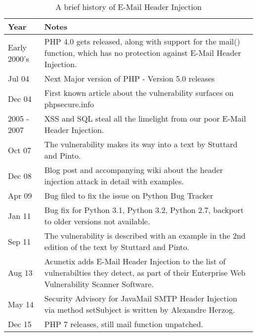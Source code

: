 \begin{table}[!htbp]
	\centering
	\begin{tabular}{|p{2cm}|p{12cm}|}
		\hline
		{Year} & { Notes}\\
		\hline

		{Early 2000's } & { PHP 4.0 gets released, along with support for the mail() function, which has no protection against E-Mail Header Injection.}\\
		\hline

		{Jul 04} & { Next Major version of PHP - Version 5.0 releases}\\
		\hline

		{Dec 04} & { First known article about the vulnerability surfaces on phpsecure.info}\\
		\hline

		{2005 - 2007} & {XSS and SQL steal all the limelight from our poor E-Mail Header Injection.}\\
		\hline

		{Oct 07} & {The vulnerability makes its way into a text by Stuttard and Pinto. }\\
		\hline

		{Dec 08} & {Blog post and accompanying wiki about the header injection attack in detail with examples.}\\
		\hline

		{Apr 09} & {Bug filed to fix the issue on Python Bug Tracker}\\
		\hline

		{Jan 11} & {Bug fix for Python 3.1, Python 3.2, Python 2.7, backport to older versions not available.}\\
		\hline

		{Sep 11} & {The vulnerability is described with an example in the 2nd edition of the text by Stuttard and Pinto.}\\
		\hline

		{Aug 13} & {Acunetix adds E-Mail Header Injection to the list of vulnerabilties they detect, as part of their Enterprise Web Vulnerability Scanner Software.}\\
		\hline

		{May 14} & {Security Advisory for JavaMail SMTP Header Injection via method setSubject is written by Alexandre Herzog.}\\
		\hline

		{Dec 15}  & {PHP 7 releases, still mail function unpatched.}\\
		\hline
	\end{tabular}
	\caption{A brief history of E-Mail Header Injection}
	\label{tab:history}
\end{table}
